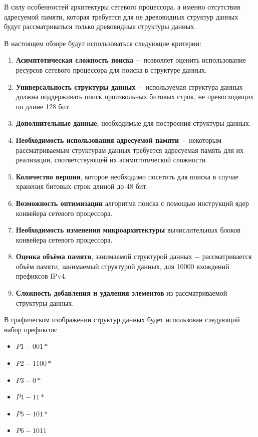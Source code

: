 \documentclass[a4paper, 12pt, titlepage, finall]{extreport}
\begin{document}
        В силу особенностей архитектуры сетевого процессора, а именно отсутствия адресуемой памяти, 
        которая требуется для не древовидных структур данных будут рассматриваться только древовидные структуры данных. 
        
        В настоящем обзоре будут использоваться следующие критерии:
        \begin{enumerate}
            \item {\bf Асимптотическая сложность поиска} $-$ позволяет оценить использование ресурсов сетевого процессора для поиска в структуре данных.
            \item {\bf Универсальность структуры данных} $-$ используемая структура данных должна поддерживать поиск произвольных битовых строк,
                  не превосходящих по длине 128 бит.
            \item {\bf Дополнительные данные}, необходимые для построения структуры данных.
            \item {\bf Необходимость использования адресуемой памяти} $-$ некоторым рассматриваемым структурам данных требуется адресуемая память для их реализации, соответствующей их асимптотической сложности.
            \item {\bf Количество вершин}, которое необходимо посетить для поиска в случае хранения битовых строк длиной до 48 бит.
            \item {\bf Возможность оптимизации} алгоритма поиска с помощью инструкций ядер конвейера сетевого процессора.
            \item {\bf Необходимость изменения микроархитектуры} вычислительных блоков конвейера сетевого процессора.
            \item {\bf Оценка объёма памяти}, занимаемой структурой данных $-$ рассматривается объём памяти, занимаемый структурой данных, для 10000 вхождений префиксов IPv4.
            \item {\bf Сложность добавления и удаления элементов} из рассматриваемой структуры данных.
        \end{enumerate}
        \newpage
        В графическом изображении структур данных будет использован следующий набор префиксов:
        \begin{itemize}
            \item $P1 - 001*$
            \item $P2 - 1100*$
            \item $P3 - 0*$
            \item $P4 - 11*$
            \item $P5 - 101*$
            \item $P6 - 1011$
        \end{itemize}
\end{document}
